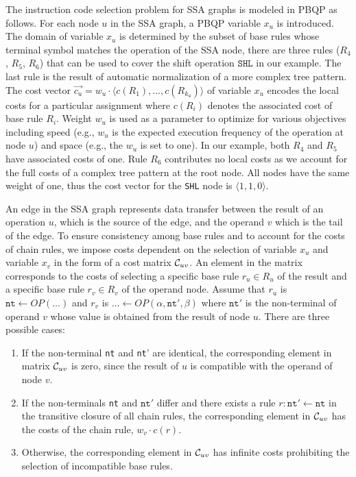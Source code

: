 The instruction code selection problem for SSA graphs is modeled in PBQP as
follows. For each node $u$ in the SSA graph, a PBQP variable $x_u$ is
introduced. The domain of variable $x_u$ is determined by the subset
of base rules whose terminal symbol matches the operation of the SSA
node, \eg there are three rules ($R_4$, $R_5$, $R_6$) that can be
used to cover the shift operation $\texttt{SHL}$ in our example. The
last rule is the result of automatic normalization of a more complex
tree pattern.
The cost vector $\vec{c_u}= w_u \cdot \langle c(R_1), \dots,
c(R_{k_u}) \rangle$ of variable $x_u$ encodes the local costs for a
particular assignment where $c(R_i)$ denotes the associated cost of
base rule $R_i$. Weight $w_u$ is used as a parameter to optimize for
various objectives including speed (e.g., $w_u$ is the expected
execution frequency of the operation at node $u$) and space (e.g., the
$w_u$ is set to one). In our example, both $R_4$ and $R_5$ have
associated costs of one. Rule $R_6$ contributes no local costs as we
account for the full costs of a complex tree pattern at the root
node. All nodes have the same weight of one, thus the cost vector for
the \texttt{SHL} node is $\langle1, 1, 0 \rangle$.

An edge in the SSA graph represents data transfer between the result
of an operation $u$, which is the source of the edge, and the operand
$v$ which is the tail of the edge.  To ensure consistency among base
rules and to account for the costs of chain rules, we impose costs
dependent on the selection of variable $x_u$ and variable $x_v$ in the
form of a cost matrix $\mathcal C_{uv}$. An element in the matrix
corresponds to the costs of selecting a specific base rule $r_u \in
R_u$ of the result and a specific base rule $r_v \in R_v$ of the
operand node. Assume that $r_u $ is $\texttt{nt} \leftarrow
\textit{OP} (\dots)$ and $r_v$ is $\dots \leftarrow \textit{OP}
(\alpha, \texttt{nt}', \beta)$ where $\texttt{nt}'$ is the
non-terminal of operand $v$ whose value is obtained from the result of
node $u$. There are three possible cases:
\begin{enumerate}
\item If the non-terminal \texttt{nt} and \texttt{nt}' are identical,
  the corresponding element in matrix $\mathcal C_{uv}$ is zero,
  since the result of $u$ is compatible with the operand of node $v$.
\item If the non-terminals \texttt{nt} and $\texttt{nt}'$ differ and
  there exists a rule $r: \texttt{nt}' \leftarrow \texttt{nt}$ in the
  transitive closure of all chain rules, the corresponding element in
  $\mathcal C_{uv}$ has the costs of the chain rule, \ie $w_v \cdot
  c(r)$.
\item Otherwise, the corresponding element in $\mathcal C_{uv}$ has
  infinite costs prohibiting the selection of incompatible base rules.
\end{enumerate}

